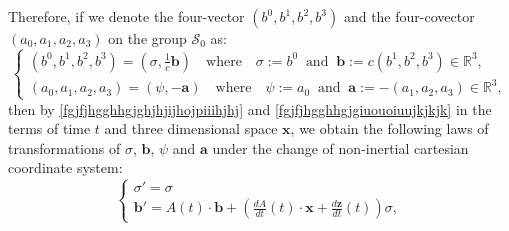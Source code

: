 \documentclass{article}
\theoremstyle{definition}
\theoremstyle{remark}
\renewcommand{\vec}[1]{\mathbf{#1}}
\newcommand{\er}{\eqref}
\newcommand{\er}{\eqref}
\begin{document}
%
%
%
\begin{comment}
\begin{equation}\label{fgjfjhgghhgjghjhjijhojihjhj}
\begin{cases}
a'_0=\frac{\partial f^{(0)}}{\partial
x^0}a_0+\sum_{k=1}^{3}\frac{\partial f^{(k)}}{\partial x^0}a_k
\\
a'_j=\frac{\partial f^{(0)}}{\partial
x^j}a_0+\sum_{k=1}^{3}\frac{\partial f^{(k)}}{\partial
x^j}a_k\quad\quad\forall j=1,2,3,
\end{cases}
\end{equation}
and
\begin{equation}\label{fgjfjhgghhgjgiuouoiuuhjhj}
\begin{cases}
b'^0=\frac{\partial f^{(0)}}{\partial
x^0}b^0+\sum_{k=1}^{3}\frac{\partial f^{(0)}}{\partial x^k}b^k
\\
b'^j=\frac{\partial f^{(j)}}{\partial
x^0}b^0+\sum_{k=1}^{3}\frac{\partial f^{(j)}}{\partial
x^k}b^k\quad\quad\forall j=1,2,3.
\end{cases}
\end{equation}
\end{comment}
%
%
%
Therefore, if we denote the four-vector $(b^0,b^1,b^2,b^3)$ and the
four-covector $(a_0,a_1,a_2,a_3)$ on the group $\mathcal{S}_0$ as:
\begin{equation}\label{fgjfjhgghhgjghjhjijhojihjhjjijhjjj}
\begin{cases}
(b^0,b^1,b^2,b^3)=\left(\sigma,\frac{1}{c}\vec
b\right)\quad\text{where}\quad
\sigma:=b^0\;\;\text{and}\;\;\vec b:=c(b^1,b^2,b^3)\in\mathbb{R}^3,\\
(a_0,a_1,a_2,a_3)=(\psi,-\vec a)\quad\text{where}\quad
\psi:=a_0\;\;\text{and}\;\;\vec a:=-(a_1,a_2,a_3)\in\mathbb{R}^3,
\end{cases}
\end{equation}
then by \er{fgjfjhgghhgjghjhjijhojpiiihjhj} and
\er{fgjfjhgghhgjgiuouoiuujkjkjk} in the terms of time $t$ and three
dimensional space $\vec x$, we obtain the following laws of
transformations of $\sigma$, $\vec b$, $\psi$ and $\vec a$ under the
change of non-inertial cartesian coordinate system:
\begin{equation}\label{fgjfjhgghhgjgiuouoiuujkjkjkojkoiu}
\begin{cases}
\sigma'=\sigma
\\
\vec b'=A\left(t\right)\cdot\vec
b+\left(\frac{dA}{dt}\left(t\right)\cdot\vec x+\frac{d \vec
z}{dt}\left(t\right)\right)\sigma,
\end{cases}
\end{equation}
\end{document}

